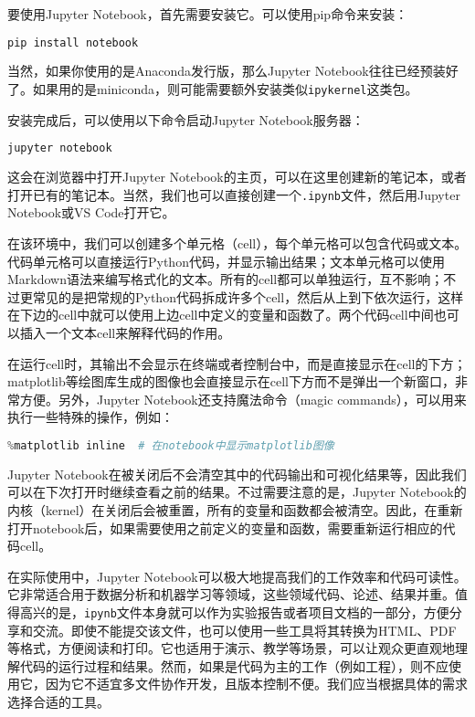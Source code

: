 要使用Jupyter Notebook，首先需要安装它。可以使用pip命令来安装：
\begin{lstlisting}[language=bash]
pip install notebook
\end{lstlisting}
当然，如果你使用的是Anaconda发行版，那么Jupyter Notebook往往已经预装好了。如果用的是miniconda，则可能需要额外安装类似\texttt{ipykernel}这类包。

安装完成后，可以使用以下命令启动Jupyter Notebook服务器：
\begin{lstlisting}[language=bash]
jupyter notebook
\end{lstlisting}
这会在浏览器中打开Jupyter Notebook的主页，可以在这里创建新的笔记本，或者打开已有的笔记本。当然，我们也可以直接创建一个\texttt{.ipynb}文件，然后用Jupyter Notebook或VS Code打开它。

在该环境中，我们可以创建多个单元格（cell），每个单元格可以包含代码或文本。代码单元格可以直接运行Python代码，并显示输出结果；文本单元格可以使用Markdown语法来编写格式化的文本。所有的cell都可以单独运行，互不影响；不过更常见的是把常规的Python代码拆成许多个cell，然后从上到下依次运行，这样在下边的cell中就可以使用上边cell中定义的变量和函数了。两个代码cell中间也可以插入一个文本cell来解释代码的作用。

在运行cell时，其输出不会显示在终端或者控制台中，而是直接显示在cell的下方；matplotlib等绘图库生成的图像也会直接显示在cell下方而不是弹出一个新窗口，非常方便。另外，Jupyter Notebook还支持魔法命令（magic commands），可以用来执行一些特殊的操作，例如：
\begin{lstlisting}[language=python]
%timeit sum(range(1000))  # 计算代码运行时间
%matplotlib inline  # 在notebook中显示matplotlib图像
\end{lstlisting}

Jupyter Notebook在被关闭后不会清空其中的代码输出和可视化结果等，因此我们可以在下次打开时继续查看之前的结果。不过需要注意的是，Jupyter Notebook的内核（kernel）在关闭后会被重置，所有的变量和函数都会被清空。因此，在重新打开notebook后，如果需要使用之前定义的变量和函数，需要重新运行相应的代码cell。

在实际使用中，Jupyter Notebook可以极大地提高我们的工作效率和代码可读性。它非常适合用于数据分析和机器学习等领域，这些领域代码、论述、结果并重。值得高兴的是，\texttt{ipynb}文件本身就可以作为实验报告或者项目文档的一部分，方便分享和交流。即使不能提交该文件，也可以使用一些工具将其转换为HTML、PDF等格式，方便阅读和打印。它也适用于演示、教学等场景，可以让观众更直观地理解代码的运行过程和结果。然而，如果是代码为主的工作（例如工程），则不应使用它，因为它不适宜多文件协作开发，且版本控制不便。我们应当根据具体的需求选择合适的工具。
